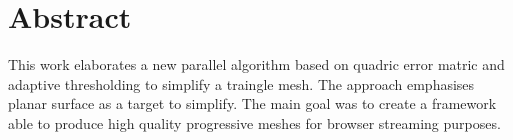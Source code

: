 
\thispagestyle{plain}

\section*{Abstract}
This work elaborates a new parallel algorithm based on quadric error matric and adaptive thresholding to simplify a traingle mesh. The approach emphasises planar surface as a target to simplify. The main goal was to create a framework able to produce high quality progressive meshes for browser streaming purposes.

\switchlanguage{\lang} %
